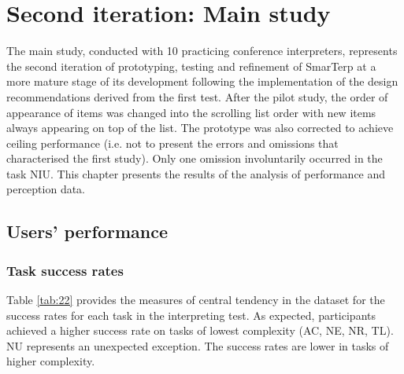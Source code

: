 \chapter{Second iteration: Main study}\label{ch:second_iteration}

The main study, conducted with 10 practicing conference interpreters, represents the second iteration of prototyping, testing and refinement of SmarTerp at a more mature stage of its development following the implementation of the design recommendations derived from the first test. After the pilot study, the order of appearance of items was changed into the scrolling list order with new items always appearing on top of the list. The prototype was also corrected to achieve ceiling performance (i.e. not to present the errors and omissions that characterised the first study). Only one omission involuntarily occurred in the task NIU. This chapter presents the results of the analysis of performance and perception data.



\section{Users' performance}

\subsection{Task success rates}

Table \ref{tab:22} provides the measures of central tendency in the dataset for the success rates for each task in the interpreting test. As expected, participants achieved a higher success rate on tasks of lowest complexity (AC, NE, NR, TL). NU represents an unexpected exception. The success rates are lower in tasks of higher complexity.

